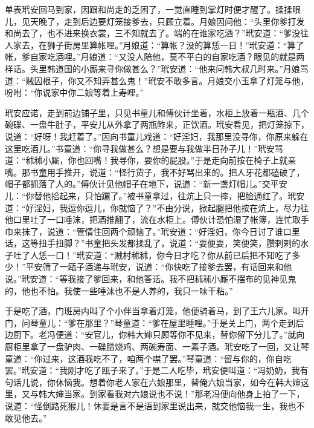 单表玳安回马到家，因跟和尚走的乏困了，一觉直睡到掌灯时便才醒了。揉揉眼儿，见天晚了，走到后边要灯笼接爹去，只顾立着。月娘因问他：“头里你爹打发和尚去了，也不进来换衣裳，三不知就去了。端的在谁家吃酒？”玳安道：“爹没往人家去，在狮子街房里算帐哩。”月娘道：“算帐？没的算恁一日！”玳安道：“算了帐，爹自家吃酒哩。”月娘道：“又没人陪他，莫不平白的自家吃酒？眼见的就是两样话。头里韩道国的小厮来寻你做甚么？”玳安道：“他来问韩大叔几时来。”月娘骂道：“贼囚根子，你又不知弄甚么鬼！”玳安不敢多言。月娘交小玉拿了灯笼与他，吩咐：“你说家中你二娘等着上寿哩。”

玳安应诺，走到前边铺子里，只见书童儿和傅伙计坐着，水柜上放着一瓶酒、几个碗碟、一盘牛肚子，平安儿从外拿了两瓶鲊来，正饮酒。玳安看见，把灯笼掠下，说道：“好呀！我赶着了。”因向书童儿戏道：“好淫妇，我那里没寻你，你原来躲在这里吃酒儿。”书童道：“你寻我做甚么？想是要与我做半日孙子儿！”玳安骂道：“秫秫小厮，你也回嘴！我寻你，要你的屁股。”于是走向前按在椅子上就亲嘴。那书童用手推开，说道：“怪行货子，我不好骂出来的。把人牙花都磕破了，帽子都抓落了人的。”傅伙计见他帽子在地下，说道：“新一盏灯帽儿。”交平安儿：“你替他拾起来，只怕躧了。”被书童拿过，往炕上只一摔，把脸通红了。玳安道：“好淫妇，我逗你逗儿，你就恼了？”不由分说，掀起腿把他按在炕上，尽力往他口里吐了一口唾沫，把酒推翻了，流在水柜上。傅伙计恐怕湿了帐簿，连忙取手巾来抹了，说道：“管情住回两个顽恼了。”玳安道：“好淫妇，你今日讨了谁口里话，这等扭手扭脚？”书童把头发都揉乱了，说道：“耍便耍，笑便笑，臜剌剌的水子吐了人恁一口！”玳安道：“贼村秫秫，你今日才吃？你从前已后把不知吃了多少！”平安筛了一瓯子酒递与玳安，说道：“你快吃了接爹去罢，有话回来和他说。”玳安道：“等我接了爹回来，和他答话。我不把秫秫小厮不摆布的见神见鬼的，他也不怕。我使一些唾沫也不是人养的，我只一味干粘。”

于是吃了酒，门班房内叫了个小伴当拿着灯笼，他便骑着马，到了王六儿家。叫开门，问琴童儿：“爹在那里？”琴童道：“爹在屋里睡哩。”于是关上门，两个走到后边厨下。老冯便道：“安官儿，你韩大婶只顾等你不见来，替你留下分儿了。”就向厨柜里拿了一盘驴肉、一碟腊烧鸡、两碗寿面、一素子酒。玳安吃了一回，又让琴童道：“你过来，这酒我吃不了，咱两个噤了罢。”琴童道：“留与你的，你自吃罢。”玳安道：“我刚才吃了瓯子来了。”于是二人吃毕，玳安便叫道：“冯奶奶，我有句话儿说，你休恼我。想着你老人家在六娘那里，替俺六娘当家，如今在韩大婶这里，又与韩大婶当家。到家看我对六娘说也不说！”那老冯便向他身上拍了一下，说道：“怪倒路死猴儿！休要是言不是语到家里说出来，就交他恼我一生，我也不敢见他去。”

